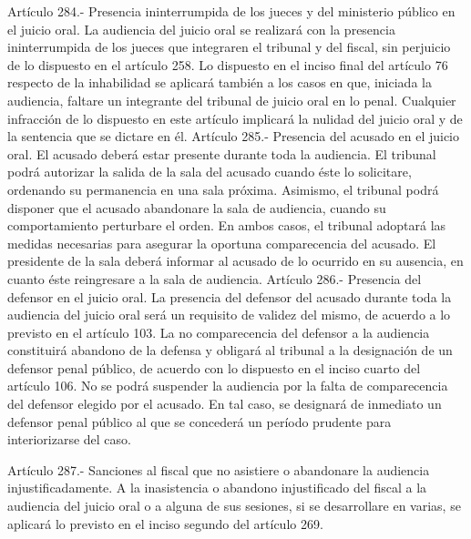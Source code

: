     Artículo 284.- Presencia ininterrumpida de los jueces y del ministerio público en el juicio oral. La audiencia del juicio oral se realizará con la presencia ininterrumpida de los jueces que integraren el tribunal y del fiscal, sin perjuicio de lo dispuesto en el artículo 258.
    Lo dispuesto en el inciso final del artículo 76 respecto de la inhabilidad se aplicará también a los casos en que, iniciada la audiencia, faltare un integrante del tribunal de juicio oral en lo penal.
    Cualquier infracción de lo dispuesto en este artículo implicará la nulidad del juicio oral y de la sentencia que se dictare en él.
    Artículo 285.- Presencia del acusado en el juicio oral. El acusado deberá estar presente durante toda la audiencia.
    El tribunal podrá autorizar la salida de la sala del acusado cuando éste lo solicitare, ordenando su permanencia en una sala próxima.
    Asimismo, el tribunal podrá disponer que el acusado abandonare la sala de audiencia, cuando su comportamiento perturbare el orden.
    En ambos casos, el tribunal adoptará las medidas necesarias para asegurar la oportuna comparecencia del acusado.
    El presidente de la sala deberá informar al acusado de lo ocurrido en su ausencia, en cuanto éste reingresare a la sala de audiencia.
    Artículo 286.- Presencia del defensor en el juicio oral. La presencia del defensor del acusado durante toda la audiencia del juicio oral será un requisito de validez del mismo, de acuerdo a lo previsto en el artículo 103.
    La no comparecencia del defensor a la audiencia constituirá abandono de la defensa y obligará al tribunal a la designación de un defensor penal público, de acuerdo con lo dispuesto en el inciso cuarto del artículo 106.
    No se podrá suspender la audiencia por la falta de comparecencia del defensor elegido por el acusado. En tal caso, se designará de inmediato un defensor penal público al que se concederá un período prudente para interiorizarse del caso.

    Artículo 287.- Sanciones al fiscal que no asistiere o abandonare la audiencia injustificadamente. A la inasistencia o abandono injustificado del fiscal a la audiencia del juicio oral o a alguna de sus sesiones, si se desarrollare en varias, se aplicará lo previsto en el inciso segundo del artículo 269.

